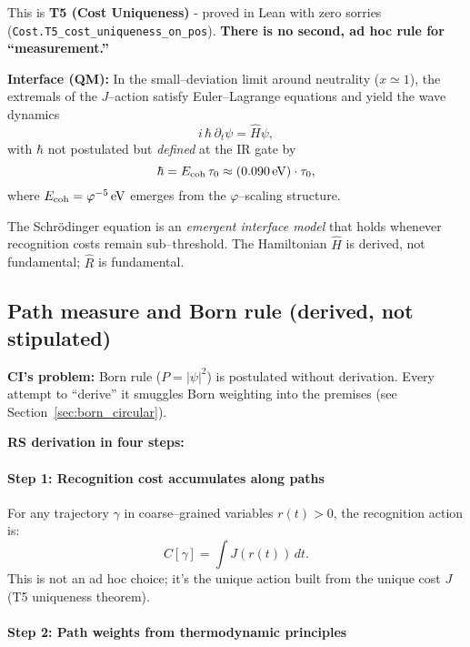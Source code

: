 \documentclass[11pt]{article}
\begin{document}
This is \textbf{T5 (Cost Uniqueness)} - proved in Lean with zero sorries (\texttt{Cost.T5\_cost\_uniqueness\_on\_pos}). \textbf{There is no second, ad hoc rule for ``measurement.''}

\textbf{Interface (QM):} In the small--deviation limit around neutrality ($x\simeq 1$), the extremals of the $J$--action satisfy Euler--Lagrange equations and yield the wave dynamics
\begin{equation}
  i\,\hbar\,\partial_t \psi = \hat H \psi,
\end{equation}
with $\hbar$ not postulated but \emph{defined} at the IR gate by
\begin{equation}
  \hbar = E_{\rm coh}\,\tau_0 \approx (0.090\,{\rm eV})\cdot \tau_0,
\end{equation}
where $E_{\rm coh} = \varphi^{-5}\,{\rm eV}$ emerges from the $\varphi$--scaling structure.

The Schrödinger equation is an \emph{emergent interface model} that holds whenever recognition costs remain sub--threshold. The Hamiltonian $\hat H$ is derived, not fundamental; $\hat R$ is fundamental.

\subsection{Path measure and Born rule (derived, not stipulated)}

\textbf{CI's problem:} Born rule ($P = |\psi|^2$) is postulated without derivation. Every attempt to ``derive'' it smuggles Born weighting into the premises (see Section~\ref{sec:born_circular}).

\textbf{RS derivation in four steps:}

\paragraph{Step 1: Recognition cost accumulates along paths}

For any trajectory $\gamma$ in coarse--grained variables $r(t) > 0$, the recognition action is:
\begin{equation}
  C[\gamma] = \int J(r(t))\, dt.
\end{equation}
This is not an ad hoc choice; it's the unique action built from the unique cost $J$ (T5 uniqueness theorem).

\paragraph{Step 2: Path weights from thermodynamic principles}
\end{document}
